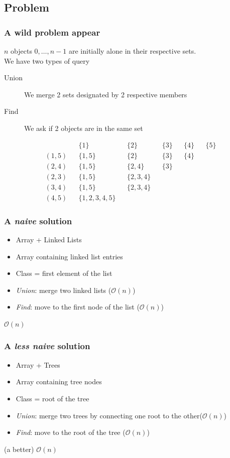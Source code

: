 \documentclass[10pt,svgnames,usenames,table]{beamer} %
\newcommand{\bigoh}{\mathcal{O}}
\begin{document}
\subsection{Problem}
\begin{frame}
  \frametitle{A wild problem appear}
  $n$ objects $0, \ldots, n-1$ are initially alone in their respective sets.\\
  We have two types of query
  \begin{description}
    \item[Union] We merge 2 sets designated by 2 respective members
    \item[Find] We ask if 2 objects are in the same set
  \end{description}
  \begin{align*}
    && \{1\} && \{2\} && \{3\} && \{4\} && \{5\}\\
    (1,5) && \{1,5\} && \{2\} && \{3\} && \{4\}\\
    (2,4) && \{1,5\} && \{2,4\} && \{3\}\\
    (2,3) && \{1,5\} && \{2,3,4\}\\
    (3,4) && \{1,5\} && \{2,3,4\}\\
    (4,5) && \{1,2,3,4,5\}
  \end{align*}
\end{frame}
\begin{frame}
  \frametitle{A \textit{naive} solution}
  \begin{itemize}
  	\item Array + Linked Lists
  	\item Array containing linked list entries
  	\item Class = first element of the list
  	\item \textit{Union}: merge two linked lists ($\bigoh(n)$)
  	\item \textit{Find}: move to the first node of the list ($\bigoh(n)$)
  \end{itemize}
  \begin{center}
  {\LARGE $\bigoh(n)$}
  \end{center}
\end{frame}

\begin{frame}
  \frametitle{A \textit{less naive} solution}
  \begin{itemize}
  	\item Array + Trees
  	\item Array containing tree nodes
  	\item Class = root of the tree
  	\item \textit{Union}: merge two trees by connecting one root to the other($\bigoh(n)$)
  	\item \textit{Find}: move to the root of the tree ($\bigoh(n)$)
  \end{itemize}
  \begin{center}
  {\LARGE (a better) $\bigoh(n)$}
  \end{center}
\end{frame}
\end{document}
